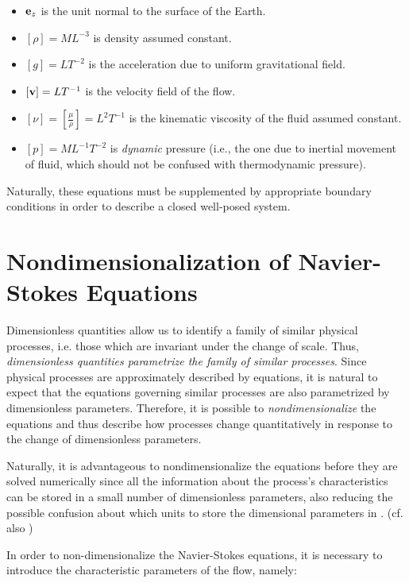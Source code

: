 \begin{itemize}

\item[] $\mathbf{e}_z$ is the unit normal to the surface of the Earth.
\item[] $ [\rho] = M L^{-3} $ is density assumed constant.
\item[] $[g] = LT^{-2} $ is the acceleration due to uniform gravitational field.
\item[] $ [\mathbf{v}] = L T^{-1} $ is the velocity field of the flow.
\item[] $ [\nu] =[\frac{\mu}{\rho}] = L^{2} T^{-1} $ is the kinematic viscosity of the fluid assumed constant.
\item[] $ [p] = M L^{-1} T^{-2} $ is \emph{dynamic} pressure (i.e., the one due to inertial movement of fluid, which should not be confused with thermodynamic pressure).

\end{itemize}

Naturally, these equations must be supplemented by appropriate boundary conditions in order to describe a closed well-posed system. 

\section{Nondimensionalization of Navier-Stokes Equations}

Dimensionless quantities allow us to identify a family of similar physical processes, i.e. those which are invariant under the change of scale. Thus, \emph{dimensionless quantities parametrize the family of similar processes}. Since physical processes are approximately described by equations, it is natural to expect that the equations governing similar processes are also parametrized by dimensionless parameters. Therefore, it is possible to \emph{nondimensionalize} the equations and thus describe how processes change quantitatively in response to the change of dimensionless parameters. 

Naturally, it is advantageous to nondimensionalize the equations before they are solved numerically since all the information about the process's characteristics can be stored in a small number of dimensionless parameters, also reducing the possible confusion about which units to store the dimensional parameters in \cite{barenblatt1}. (cf. also )

In order to non-dimensionalize the Navier-Stokes equations, it is necessary to introduce the characteristic parameters of the flow, namely:

